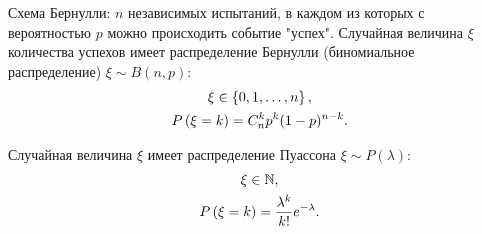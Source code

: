 Схема Бернулли: $n$ независимых испытаний, в каждом из которых с вероятностью $p$ можно происходить событие "успех"{}.
Случайная величина $\xi$ количества успехов имеет распределение Бернулли (биномиальное распределение) $\xi \sim B(n,p)$:
\begin{gather}
    \xi \in \left \{ 0, 1, \dots, n \right \} \notag, \\
    P \left ( \xi = k \right ) = C_n^k p^k (1-p)^{n-k} .
\end{gather}

Случайная величина $\xi$ имеет распределение Пуассона $\xi \sim P(\lambda)$:
\begin{gather}
    \xi \in \mathbb{N}, \\
    P \left ( \xi = k \right ) = \frac{\lambda^k}{k!} e^{-\lambda} .
\end{gather}

